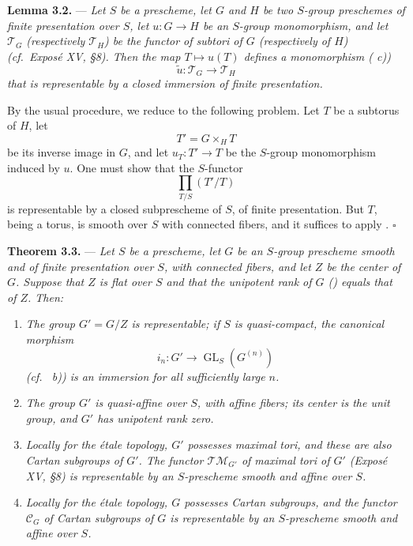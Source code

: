 \medskip
\noindent{}%
\textbf{Lemma 3.2.} --- \textit{Let \(S\) be a prescheme, let \(G\)
and \(H\) be two \(S\)-group preschemes of finite presentation over
\(S\), let \(u:G\to H\) be an \(S\)-group monomorphism, and let
\(\mathscr T_G\) (respectively \(\mathscr T_H\)) be the functor of
subtori of \(G\) (respectively of \(H\)) (cf.\ Exposé XV, \S8).
Then the map \(T\mapsto u(T)\) defines a monomorphism
( c))}
\[
  \widetilde u:\mathscr T_G\longrightarrow\mathscr T_H
\]
\textit{that is representable by a closed immersion of finite
presentation.}

By the usual procedure, we reduce to the following problem. Let
\(T\) be a subtorus of \(H\), let
\[
  T'=G\times_H T
\]
be its inverse image in \(G\), and let \(u_T:T'\to T\) be the
\(S\)-group monomorphism induced by \(u\). One must show that the
\(S\)-functor
\[
  \prod_{T/S}(T'/T)
\]
is representable by a closed subprescheme of \(S\), of finite
presentation. But \(T\), being a torus, is smooth over \(S\) with
connected fibers, and it suffices to apply .
\hfill\(\square\)

\medskip
\noindent{}%
\textbf{Theorem 3.3.} --- \textit{Let \(S\) be a prescheme, let
\(G\) be an \(S\)-group prescheme smooth and of finite presentation
over \(S\), with connected fibers, and let \(Z\) be the center of
\(G\). Suppose that \(Z\) is flat over \(S\) and that the unipotent
rank of \(G\) () equals that of \(Z\). Then:}

\begin{enumerate}
\renewcommand{\labelenumi}{\textit{\alph{enumi})}}
\item \textit{The group \(G'=G/Z\) is representable; if \(S\) is
quasi-compact, the canonical morphism}
\[
  i_n:G'\longrightarrow\operatorname{GL}_S(G^{(n)})
\]
\textit{(cf.\  b)) is an immersion for all sufficiently large
\(n\).}

\item \textit{The group \(G'\) is quasi-affine over \(S\), with
affine fibers; its center is the unit group, and \(G'\) has
unipotent rank zero.}

\item \textit{Locally for the étale topology, \(G'\) possesses
maximal tori, and these are also Cartan subgroups of \(G'\). The
functor \(\mathscr{TM}_{G'}\) of maximal tori of \(G'\)
(Exposé XV, \S8) is representable by an \(S\)-prescheme smooth and
affine over \(S\).}

\item \textit{Locally for the étale topology, \(G\) possesses
Cartan subgroups, and the functor \(\mathscr C_G\) of Cartan
subgroups of \(G\) is representable by an \(S\)-prescheme smooth
and affine over \(S\).}
\end{enumerate}


